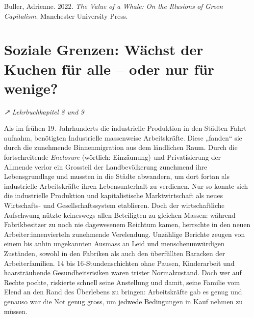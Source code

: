 \documentclass[
  nswissgerman,
  a4paper,
  DIV=11,
  numbers=noendperiod,
  oneside,
  openany]{scrreprt}
\begin{document}
\begin{tcolorbox}[enhanced jigsaw, arc=.35mm, bottomrule=.15mm, bottomtitle=1mm, breakable, colback=white, colbacktitle=quarto-callout-caution-color!10!white, colframe=quarto-callout-caution-color-frame, coltitle=black, left=2mm, leftrule=.75mm, opacityback=0, opacitybacktitle=0.6, rightrule=.15mm, title={Weiterführende Literatur}, titlerule=0mm, toprule=.15mm, toptitle=1mm]

Buller, Adrienne. 2022. \emph{The Value of a Whale: On the Illusions of
Green Capitalism}. Manchester University Press.

\end{tcolorbox}

\section{Soziale Grenzen: Wächst der Kuchen für alle -- oder nur für
wenige?}\label{soziale-grenzen-wuxe4chst-der-kuchen-fuxfcr-alle-oder-nur-fuxfcr-wenige}

\emph{↗ Lehrbuchkapitel 8 und 9}

Als im frühen 19. Jahrhunderts die industrielle Produktion in den
Städten Fahrt aufnahm, benötigten Industrielle massenweise
Arbeitskräfte. Diese „fanden`` sie durch die zunehmende Binnenmigration
aus dem ländlichen Raum. Durch die fortschreitende \emph{Enclosure}
(wörtlich: Einzäunung) und Privatisierung der Allmende verlor ein
Grossteil der Landbevölkerung zunehmend ihre Lebensgrundlage und mussten
in die Städte abwandern, um dort fortan als industrielle Arbeitskräfte
ihren Lebensunterhalt zu verdienen. Nur so konnte sich die industrielle
Produktion und kapitalistische Marktwirtschaft als neues Wirtschafts-
und Gesellschaftssystem etablieren. Doch der wirtschaftliche Aufschwung
nützte keineswegs allen Beteiligten zu gleichen Massen: während
Fabrikbesitzer zu noch nie dagewesenem Reichtum kamen, herrschte in den
neuen Arbeiter:innenvierteln zunehmende Verelendung. Unzählige Berichte
zeugen von einem bis anhin ungekannten Ausmass an Leid und
menschenunwürdigen Zuständen, sowohl in den Fabriken als auch den
überfüllten Baracken der Arbeiterfamilien. 14 bis 16-Stundenschichten
ohne Pausen, Kinderarbeit und haarsträubende Gesundheitsrisiken waren
trister Normalzustand. Doch wer auf Rechte pochte, riskierte schnell
seine Anstellung und damit, seine Familie vom Elend an den Rand des
Überlebens zu bringen: Arbeitskräfte gab es genug und genauso war die
Not genug gross, um jedwede Bedingungen in Kauf nehmen zu müssen.
\end{document}
